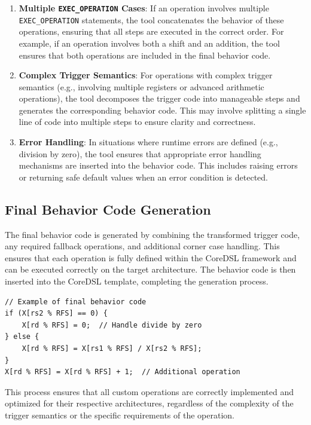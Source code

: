 \begin{enumerate}
    \item \textbf{Multiple \texttt{EXEC\_OPERATION} Cases}: If an operation involves multiple \texttt{EXEC\_OPERATION} statements, the tool concatenates the behavior of these operations, ensuring that all steps are executed in the correct order. For example, if an operation involves both a shift and an addition, the tool ensures that both operations are included in the final behavior code.

    \item \textbf{Complex Trigger Semantics}: For operations with complex trigger semantics (e.g., involving multiple registers or advanced arithmetic operations), the tool decomposes the trigger code into manageable steps and generates the corresponding behavior code. This may involve splitting a single line of code into multiple steps to ensure clarity and correctness.

    \item \textbf{Error Handling}: In situations where runtime errors are defined (e.g., division by zero), the tool ensures that appropriate error handling mechanisms are inserted into the behavior code. This includes raising errors or returning safe default values when an error condition is detected.
\end{enumerate}

\subsection{Final Behavior Code Generation}

The final behavior code is generated by combining the transformed trigger code, any required fallback operations, and additional corner case handling. This ensures that each operation is fully defined within the CoreDSL framework and can be executed correctly on the target architecture. The behavior code is then inserted into the CoreDSL template, completing the generation process.

\begin{lstlisting}
// Example of final behavior code
if (X[rs2 % RFS] == 0) {
    X[rd % RFS] = 0;  // Handle divide by zero
} else {
    X[rd % RFS] = X[rs1 % RFS] / X[rs2 % RFS];
}
X[rd % RFS] = X[rd % RFS] + 1;  // Additional operation
\end{lstlisting}

This process ensures that all custom operations are correctly implemented and optimized for their respective architectures, regardless of the complexity of the trigger semantics or the specific requirements of the operation.
